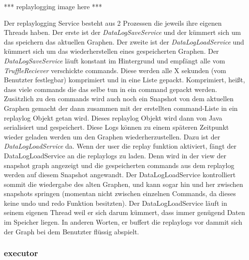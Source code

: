     *** replaylogging image here ***
    \newline
    \newline

    Der replaylogging Service besteht aus 2 Prozessen die jeweils ihre eigenen Threads haben.
    Der erste ist der \textit{DataLogSaveService} und der kümmert sich um das speichern das aktuellen
    Graphen. Der zweite ist der \textit{DataLogLoadService} und kümmert sich um das
    wiederherstellen eines gespeicherten Graphen.
    \newline
    \newline
    Der \textit{DataLogSaveService} läuft konstant im Hintergrund und empfängt alle
    vom \textit{TruffleReciever} verschickte \glspl{command}. Diese werden alle X
    sekunden (vom Benutzter festlegbar) komprimiert und in eine Liste gepackt.
    Komprimiert, heißt, dass viele \glspl{command} die das selbe tun in ein \gls{command}
    gepackt werden. Zusätzlich zu den \glspl{command} wird auch noch ein Snapshot
    von dem aktuellen Graphen gemacht der dann zusammen mit der erstellten
    \gls{command}-Liste in ein \gls{replaylog} Objekt getan wird. Dieses
    \gls{replaylog} Objekt wird dann von Java serialisiert und gespeichert.
    \newline
    \newline
    Diese Logs können zu einem späteren Zeitpunkt wieder geladen werden um den
    Graphen wiederherzustellen. Dazu ist der \textit{DataLogLoadService} da. Wenn
    der user die replay funktion aktiviert, fängt der DataLogLoadService an die
    \glspl{replaylog} zu laden. Denn wird in der view der snapshot graph angezeigt
    und die gespeicherten \glspl{command} aus dem \gls{replaylog} werden auf
    diesem Snapshot angewandt. Der DataLogLoadService kontrolliert sommit die
    wiedergabe des alten Graphen, und kann sogar hin und her zwischen snapshots
    springen (momentan nicht zwischen einzelnen Commands, da dieses keine undo
    und redo Funktion besitzten).
    \newline
    \newline
    Der DataLogLoadService läuft in seinem eigenen Thread weil er sich darum
    kümmert, dass immer genügend Daten im Speicher liegen. In anderen Worten, er
    buffert die replaylogs vor dammit sich der Graph bei dem Benutzter flüssig
    abspielt.

    \subsubsection{executor}
    \label{subsubsec:executor}

